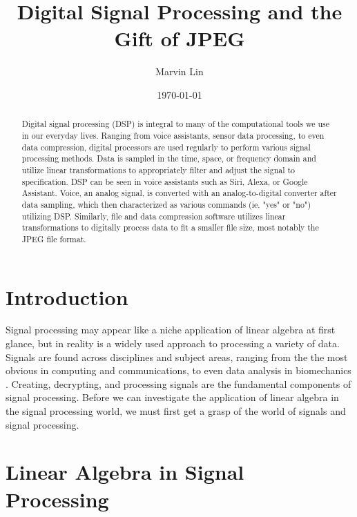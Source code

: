 \documentclass[11pt]{article}
\title{Digital Signal Processing and the Gift of JPEG}
\author{Marvin Lin}
\date{\today}
\affil{Portland Community College}
\begin{document}

\maketitle


\begin{abstract}

Digital signal processing (DSP) is integral to many of the computational tools we use in our everyday lives. Ranging from voice assistants, sensor data processing, to even data compression, digital processors are used regularly to perform various signal processing methods. Data is sampled in the time, space, or frequency domain and utilize linear transformations to appropriately filter and adjust the signal to specification. DSP can be seen in voice assistants such as Siri, Alexa, or Google Assistant. Voice, an analog signal, is converted with an analog-to-digital converter after data sampling, which then characterized as various commands (ie. "yes" or "no") utilizing DSP. Similarly, file and data compression software utilizes linear transformations to digitally process data to fit a smaller file size, most notably the JPEG file format.

\end{abstract}


\section{Introduction}
Signal processing may appear like a niche application of linear algebra at first glance, but in reality is a widely used approach to processing a variety of data. Signals are found across disciplines and subject areas, ranging from the the most obvious in computing and communications, to even data analysis in biomechanics \cite{book:lay}. Creating, decrypting, and processing signals are the fundamental components of signal processing. Before we can investigate the application of linear algebra in the signal processing world, we must first get a grasp of the world of signals and signal processing.

\section{Linear Algebra in Signal Processing}
\end{document}
